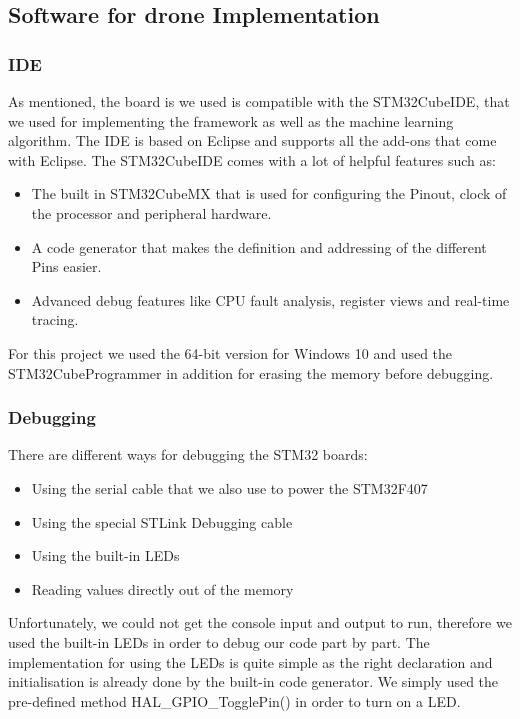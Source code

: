 \subsection{Software for drone Implementation}
\subsubsection*{IDE}
As mentioned, the board is we used is compatible with the STM32CubeIDE, that we used for implementing the framework as well as the machine learning algorithm. The IDE is based on Eclipse and supports all the add-ons that come with Eclipse. 
The STM32CubeIDE comes with a lot of helpful features such as:
\begin{itemize}
    \item The built in STM32CubeMX that is used for configuring the Pinout, clock of the processor and peripheral hardware.
    \item A code generator that makes the definition and addressing of the different Pins easier. 
    \item Advanced debug features like CPU fault analysis, register views and real-time tracing.
\end{itemize}
For this project we used the 64-bit version for Windows 10 and used the STM32CubeProgrammer in addition for erasing the memory before debugging. 

\subsubsection*{Debugging}
There are different ways for debugging the STM32 boards:
\begin{itemize}
    \item Using the serial cable that we also use to power the STM32F407
    \item Using the special STLink Debugging cable
    \item Using the built-in LEDs 
    \item Reading values directly out of the memory 
\end{itemize}
Unfortunately, we could not get the console input and output to run, therefore we used the built-in LEDs in order to debug our code part by part. The implementation for using the LEDs is quite simple as the right declaration and initialisation is already done by the built-in code generator. We simply used the pre-defined method HAL\_GPIO\_TogglePin() in order to turn on a LED.

